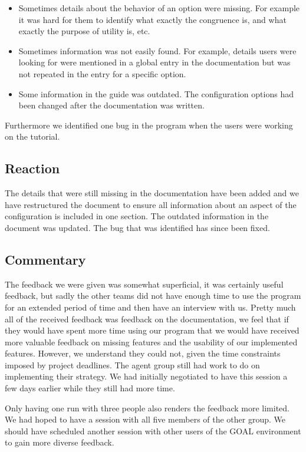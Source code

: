 \documentclass[11pt]{article}
\begin{document}
\begin{itemize}
	\item Sometimes details about the behavior of an option were missing. For example it was hard for them to identify what exactly the congruence is, and what exactly the purpose of utility is, etc.
	\item Sometimes information was not easily found. For example, details users were looking for were mentioned in a global entry in the documentation but was not repeated in the entry for a specific option.
	\item Some information in the guide was outdated. The configuration options had been changed after the documentation was written.
\end{itemize}

Furthermore we identified one bug in the program when the users were working on the tutorial. 
\subsection{Reaction}
The details that were still missing in the documentation have been added and we have restructured the document to ensure all information about an aspect of the configuration is included in one section. The outdated information in the document was updated. The bug that was identified has since been fixed.

\subsection{Commentary}
The feedback we were given was somewhat superficial, it was certainly useful feedback, but sadly the other teams did not have enough time to use the program for an extended period of time and then have an interview with us. Pretty much all of the received feedback was feedback on the documentation, we feel that if they would have spent more time using our program that we would have received more valuable feedback on missing features and the usability of our implemented features. However, we understand they could not, given the time constraints imposed by project deadlines. The agent group still had work to do on implementing their strategy. We had initially negotiated to have this session a few days earlier while they still had more time.

Only having one run with three people also renders the feedback more limited. We had hoped to have a session with all five members of the other group. We should have scheduled another session with other users of the GOAL environment\cite{GOAL Env} to gain more diverse feedback.
\end{document}
